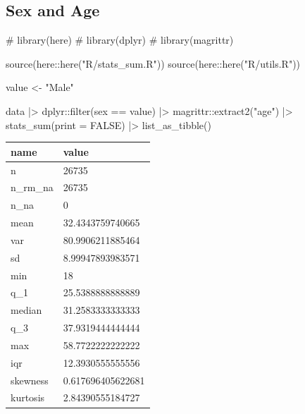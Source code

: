 \documentclass[
  12pt,
  a4paper,
  oneside]{tesesusp}
\newenvironment{Shaded}{\begin{snugshade}}{\end{snugshade}}
\newcommand{\AttributeTok}[1]{\textcolor[rgb]{0.40,0.45,0.13}{#1}}
\newcommand{\CommentTok}[1]{\textcolor[rgb]{0.37,0.37,0.37}{#1}}
\newcommand{\ConstantTok}[1]{\textcolor[rgb]{0.56,0.35,0.01}{#1}}
\newcommand{\FunctionTok}[1]{\textcolor[rgb]{0.28,0.35,0.67}{#1}}
\newcommand{\NormalTok}[1]{\textcolor[rgb]{0.00,0.23,0.31}{#1}}
\newcommand{\OtherTok}[1]{\textcolor[rgb]{0.00,0.23,0.31}{#1}}
\newcommand{\SpecialCharTok}[1]{\textcolor[rgb]{0.37,0.37,0.37}{#1}}
\newcommand{\StringTok}[1]{\textcolor[rgb]{0.13,0.47,0.30}{#1}}
\begin{document}
\begin{Shaded}
\end{Shaded}

\hypertarget{sex-and-age}{%
\subsection{Sex and Age}\label{sex-and-age}}

\begin{Shaded}
\begin{Highlighting}[numbers=left,,]
\CommentTok{\# library(here)}
\CommentTok{\# library(dplyr)}
\CommentTok{\# library(magrittr)}

\FunctionTok{source}\NormalTok{(here}\SpecialCharTok{::}\FunctionTok{here}\NormalTok{(}\StringTok{"R/stats\_sum.R"}\NormalTok{))}
\FunctionTok{source}\NormalTok{(here}\SpecialCharTok{::}\FunctionTok{here}\NormalTok{(}\StringTok{"R/utils.R"}\NormalTok{))}

\NormalTok{value }\OtherTok{\textless{}{-}} \StringTok{"Male"}

\NormalTok{data }\SpecialCharTok{|\textgreater{}}
\NormalTok{  dplyr}\SpecialCharTok{::}\FunctionTok{filter}\NormalTok{(sex }\SpecialCharTok{==}\NormalTok{ value) }\SpecialCharTok{|\textgreater{}}
\NormalTok{  magrittr}\SpecialCharTok{::}\FunctionTok{extract2}\NormalTok{(}\StringTok{"age"}\NormalTok{) }\SpecialCharTok{|\textgreater{}}
  \FunctionTok{stats\_sum}\NormalTok{(}\AttributeTok{print =} \ConstantTok{FALSE}\NormalTok{) }\SpecialCharTok{|\textgreater{}}
  \FunctionTok{list\_as\_tibble}\NormalTok{()}
\end{Highlighting}
\end{Shaded}

\begin{table}
\centering
\begin{tabular}{l|l}
\hline
name & value\\
\hline
n & 26735\\
\hline
n\_rm\_na & 26735\\
\hline
n\_na & 0\\
\hline
mean & 32.4343759740665\\
\hline
var & 80.9906211885464\\
\hline
sd & 8.99947893983571\\
\hline
min & 18\\
\hline
q\_1 & 25.5388888888889\\
\hline
median & 31.2583333333333\\
\hline
q\_3 & 37.9319444444444\\
\hline
max & 58.7722222222222\\
\hline
iqr & 12.3930555555556\\
\hline
skewness & 0.617696405622681\\
\hline
kurtosis & 2.84390555184727\\
\hline
\end{tabular}
\end{table}
\end{document}

